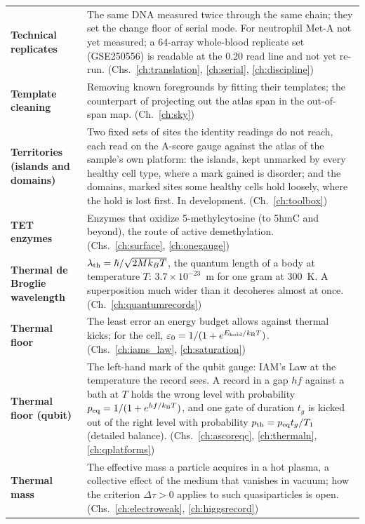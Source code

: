 {\begin{longtable}{@{}>{\raggedright\arraybackslash}p{}>{\raggedright\arraybackslash}p{}@{}}
\textbf{Technical replicates} & The same DNA measured twice through the same chain; they set the change floor of serial mode. For neutrophil Met-A not yet measured; a 64-array whole-blood replicate set (GSE250556) is readable at the 0.20 read line and not yet re-run. {\footnotesize(Chs.~\ref{ch:translation}, \ref{ch:serial}, \ref{ch:discipline})}\\[1pt]
\textbf{Template cleaning} & Removing known foregrounds by fitting their templates; the counterpart of projecting out the atlas span in the out-of-span map. {\footnotesize(Ch.~\ref{ch:sky})}\\[1pt]
\textbf{Territories (islands and domains)} & Two fixed sets of sites the identity readings do not reach, each read on the A-score gauge against the atlas of the sample's own platform: the islands, kept unmarked by every healthy cell type, where a mark gained is disorder; and the domains, marked sites some healthy cells hold loosely, where the hold is lost first. In development. {\footnotesize(Ch.~\ref{ch:toolbox})}\\[1pt]
\textbf{TET enzymes} & Enzymes that oxidize 5-methylcytosine (to 5hmC and beyond), the route of active demethylation. {\footnotesize(Chs.~\ref{ch:surface}, \ref{ch:onegauge})}\\[1pt]
\textbf{Thermal de Broglie wavelength} & $\lambda_{\rm th}=\hbar/\sqrt{2Mk_BT}$, the quantum length of a body at temperature $T$: $3.7\times10^{-23}$~m for one gram at 300~K. A superposition much wider than it decoheres almost at once. {\footnotesize(Ch.~\ref{ch:quantumrecords})}\\[1pt]
\textbf{Thermal floor} & The least error an energy budget allows against thermal kicks; for the cell, $\varepsilon_0=1/(1+e^{E_{\rm hold}/k_{\mathrm B} T})$. {\footnotesize(Chs.~\ref{ch:iams_law}, \ref{ch:saturation})}\\[1pt]
\textbf{Thermal floor (qubit)} & The left-hand mark of the qubit gauge: IAM's Law at the temperature the record sees. A record in a gap $hf$ against a bath at $T$ holds the wrong level with probability $p_{\rm eq}=1/(1+e^{hf/k_{\mathrm B} T})$, and one gate of duration $t_g$ is kicked out of the right level with probability $p_{\rm th}=p_{\rm eq}t_g/T_1$ (detailed balance). {\footnotesize(Chs.~\ref{ch:ascoreqc}, \ref{ch:thermaln}, \ref{ch:qplatforms})}\\[1pt]
\textbf{Thermal mass} & The effective mass a particle acquires in a hot plasma, a collective effect of the medium that vanishes in vacuum; how the criterion $\Delta\tau>0$ applies to such quasiparticles is open. {\footnotesize(Chs.~\ref{ch:electroweak}, \ref{ch:higgsrecord})}\\[1pt]

\end{longtable}}
